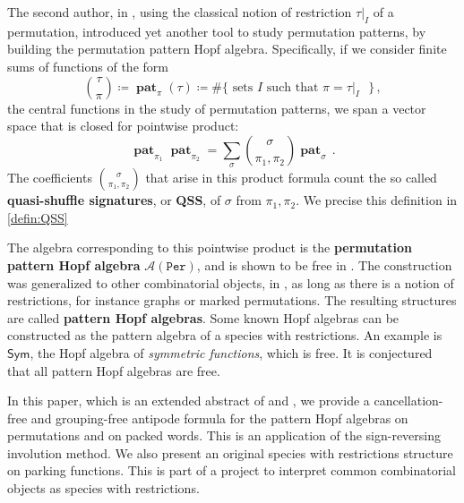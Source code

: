 \documentclass[submission]{FPSAC2023}
\theoremstyle{definition}
\DeclareMathOperator{\pat}{\mathbf{pat}}
\begin{document}
The second author, in \cite{Vargas}, using the classical notion of restriction $\tau|_I$ of a permutation, introduced yet another tool to study permutation patterns, by building the permutation pattern Hopf algebra.
Specifically, if we consider finite sums of functions of the form 
$$ \binom{\tau}{\pi} \coloneqq \pat_{\pi}(\tau)\coloneqq  \#\{\text{ sets $I$ such that $\pi= \tau|_I$ }\}\, ,$$
the central functions in the study of permutation patterns, we span a vector space that is closed for pointwise product:
\begin{equation}\label{eq:prodperm}
\pat_{\pi_1} \pat_{\pi_2} = \sum_{\sigma} \binom{\sigma}{\pi_1, \pi_2} \pat_{\sigma} \, .
\end{equation}
The coefficients $\binom{\sigma}{\pi_1, \pi_2}$ that arise in this product formula count the so called \textbf{quasi-shuffle signatures}, or \textbf{QSS}, of $\sigma$ from $\pi_1, \pi_2$.
We precise this definition in \cref{defin:QSS}

The algebra corresponding to this pointwise product is the \textbf{permutation pattern Hopf algebra} $\mathcal{A}(\mathtt{Per})$, and is shown to be free in \cite{Vargas}. The construction was generalized to other combinatorial objects, in \cite{Penaguiao2020}, as long as there is a notion of restrictions, for instance graphs or marked permutations.
The resulting structures are called \textbf{pattern Hopf algebras}. Some known Hopf algebras can be constructed as the pattern algebra of a species with restrictions.
An example is $\mathsf{Sym}$, the Hopf algebra of \textit{symmetric functions}, which is free.
It is conjectured that all pattern Hopf algebras are free.

In this paper, which is an extended abstract of \cite{PV2022} and \cite{penaguiao2023polynomial}, we provide a cancellation-free and grouping-free antipode formula for the pattern Hopf algebras on permutations and on packed words.
This is an application of the sign-reversing involution method. We also present an original species with restrictions structure on parking functions.
This is part of a project to interpret common combinatorial objects as species with restrictions.

\end{document}
